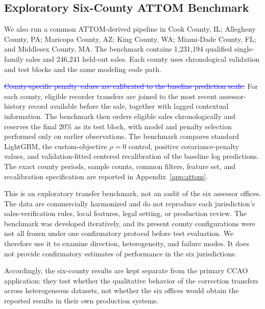 \documentclass[10pt]{article}
\theoremstyle{definition}
\newcommand{\1}{\mathbf{1}}
\begin{document}
{{\subsection{Exploratory Six-County ATTOM Benchmark}
\label{subsec:attom_design}

We also run a common ATTOM-derived pipeline in Cook County, IL; Allegheny County, PA; Maricopa County, AZ; King County, WA; Miami-Dade County, FL; and Middlesex County, MA. The benchmark contains 1,231,194 qualified single-family sales and 246,241 held-out sales. Each county uses chronological validation and test blocks and the same modeling code path.

\textcolor{blue}{\sout{County-specific penalty values are calibrated to the baseline prediction scale.}}
\textcolor{impGreen}{For each county, eligible recorder transfers are joined to the most recent assessor-history record available before the sale, together with lagged contextual information. The benchmark then orders eligible sales chronologically and reserves the final 20\% as its test block, with model and penalty selection performed only on earlier observations. The benchmark compares standard LightGBM, the custom-objective $\rho=0$ control, positive covariance-penalty values, and validation-fitted centered recalibration of the baseline log predictions. The exact county periods, sample counts, common filters, feature set, and recalibration specification are reported in Appendix~\ref{app:attom}.}

\textcolor{impGreen}{}

This is an exploratory transfer benchmark, not an audit of the six assessor offices. The data are commercially harmonized and do not reproduce each jurisdiction's sales-verification rules, local features, legal setting, or production review. The benchmark was developed iteratively, and its present county configurations were not all frozen under one confirmatory protocol before test evaluation. We therefore use it to examine direction, heterogeneity, and failure modes. It does not provide confirmatory estimates of performance in the six jurisdictions.

\textcolor{impGreen}{Accordingly, the six-county results are kept separate from the primary CCAO application: they test whether the qualitative behavior of the correction transfers across heterogeneous datasets, not whether the six offices would obtain the reported results in their own production systems.}

}}
\end{document}
